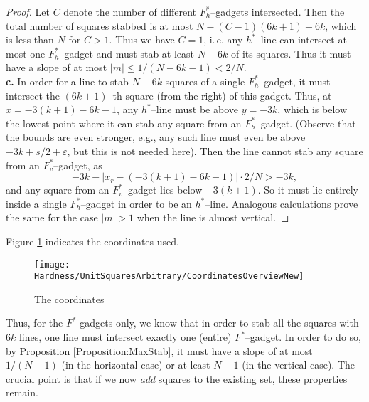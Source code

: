 \documentclass[12pt]{article}
\newcommand{\eps}{\varepsilon}
\begin{document}
\begin{proof}
Let $C$ denote the number of different $F_h^*$--gadgets intersected. Then the total number of squares stabbed is at most $N - (C-1)(6k + 1) + 6k$, which is less than $N$ for $C > 1$. Thus we have $C = 1$, i.\,e. any $h^*$--line can intersect at most one $F_h^*$--gadget and must stab at least $N - 6k$ of its squares. Thus it must have a slope of at most $|m| \leq 1/(N - 6k - 1) < 2/N$.
\medskip
\noindent
\\
\textbf{c.} In order for a line to stab $N - 6k$ squares of a single $F_h^*$--gadget, it must intersect the $(6k + 1)$--th square (from the right) of this gadget. Thus, at $x = -3(k+1) - 6k - 1$, any $h^*$--line must be above $y = -3k$, which is below the lowest point where it can stab any square from an $F_h^*$--gadget. (Observe that the bounds are even stronger, e.g., any such line must even be above $-3k + s/2 + \eps$, but this is not needed here).  Then the line cannot stab any square from an $F_v^*$--gadget, as 
\[-3k - |x_r - (-3(k+1) - 6k - 1)|\cdot 2/N > -3k,\]
and any square from an $F_v^*$--gadget lies below $-3(k + 1)$. So it must lie entirely inside a single $F_h^*$--gadget in order to be an $h^*$--line. 
Analogous calculations prove the same for the case $|m| > 1$ when the line is almost vertical.
\end{proof}
Figure \ref{fig:CoordinatesOverviewNew} indicates the coordinates used.
\begin{figure}[ht]
	\centering
		\texttt{[image: Hardness/UnitSquaresArbitrary/CoordinatesOverviewNew]}
	\caption{The coordinates}
	\label{fig:CoordinatesOverviewNew}
\end{figure}
Thus, for the $F^*$ gadgets only, we know that in order to stab all the squares with $6k$ lines, one line must intersect exactly one (entire) $F^*$--gadget. In order to do so, by Proposition \ref{Proposition:MaxStab}, it must have a slope of at most $1/(N-1)$ (in the horizontal case) or at least $N-1$ (in the vertical case). The crucial point is  that if we now \emph{add} squares to the existing set, these properties remain.
\end{document}
